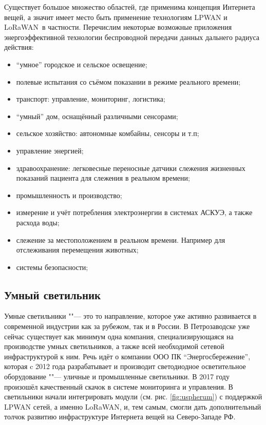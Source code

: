 Существует большое множество областей, где применима концепция Интернета вещей, 
а значит имеет место быть применение технологиям LPWAN и LoRaWAN\texttrademark~в 
частности.
Перечислим некоторые возможные приложения энергоэффективной технологии 
беспроводной передачи данных дальнего радиуса действия:
\begin{itemize}
 \item ``умное'' городское и сельское освещение;
 \item полевые испытания со съёмом показании в режиме реального времени;
 \item транспорт: управление, мониторинг, логистика;
 \item ``умный'' дом, оснащённый различными сенсорами;
 \item сельское хозяйство: автономные комбайны, сенсоры и т.п;
 \item управление энергией;
 \item здравоохранение: легковесные переносные датчики слежения жизненных 
показаний пациента для слежения в реальном времени;
 \item промышленность и производство; 
 \item измерение и учёт потребления электроэнергии в системах АСКУЭ, а также 
расхода воды;
 \item слежение за местоположением в реальном времени. Например для 
отслеживания 
перемещения животных; 
 \item системы безопасности; 
\end{itemize}


\subsection{Умный светильник}

Умные светильники ""--- это то направление, которое уже активно развивается в 
современной индустрии как за рубежом, так и в России.
В Петрозаводске уже сейчас существует как минимум одна компания, 
специализирующаяся на производстве умных светильников, а также всей необходимой 
сетевой инфраструктурой к ним. 
Речь идёт о компании ООО ПК ``Энергосбережение'', которая c 2012 года 
разрабатывает и производит светодиодное осветительное оборудование ""--- 
уличные 
и промышленные светильники.
В 2017 году произошёл качественный скачок в системе мониторинга и управления.
В светильники начали интегрировать модули (см. рис. \ref{fig:uspherum}) с 
поддержкой LPWAN сетей, а именно LoRaWAN\texttrademark, и, тем самым, смогли 
дать 
дополнительный толчок развитию инфраструктуре Интернета вещей на Северо-Западе 
РФ.

